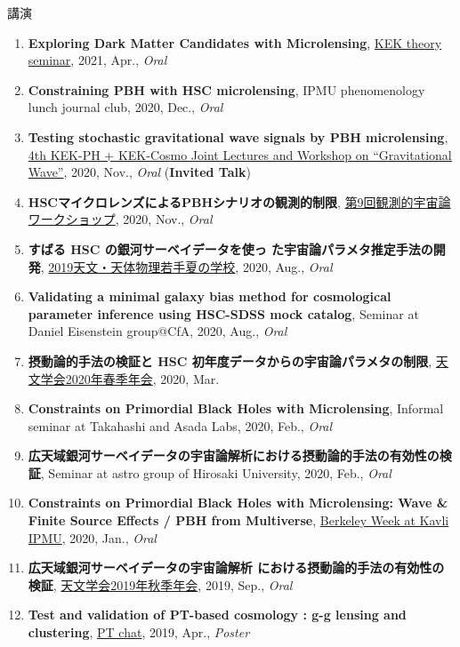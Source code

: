 \begin{rSection}{講演}
\begin{enumerate}[itemsep=0pt, parsep=0pt, topsep=0pt, partopsep=0pt]
\item \textbf{Exploring Dark Matter Candidates with Microlensing}, \href{https://www.kek.jp/ja/conference/20210407-3/}{KEK theory seminar}, 2021, Apr., \textit{Oral}
\item \textbf{Constraining PBH with HSC microlensing}, IPMU phenomenology lunch journal club, 2020, Dec., \textit{Oral}
\item \textbf{Testing stochastic gravitational wave signals by PBH microlensing}, \href{http://conference-indico.kek.jp/event/117/timetable/#day-2020-11-04}{4th KEK-PH + KEK-Cosmo Joint Lectures and Workshop on ``Gravitational Wave''}, 2020, Nov., \textit{Oral} (\textbf{Invited Talk})
\item \textbf{HSCマイクロレンズによるPBHシナリオの観測的制限}, \href{https://indico.ipmu.jp/event/382/timetable/#all}{第9回観測的宇宙論ワークショップ}, 2020, Nov., \textit{Oral}
\item \textbf{すばる HSC の銀河サーベイデータを使っ た宇宙論パラメタ推定手法の開発}, \href{http://www.astro-wakate.org/ss2019/web/}{2019天文・天体物理若手夏の学校}, 2020, Aug., \textit{Oral}
\item \textbf{Validating a minimal galaxy bias method for cosmological parameter inference using HSC-SDSS mock catalog}, Seminar at Daniel Eisenstein group@CfA, 2020, Aug., \textit{Oral}
\item \textbf{摂動論的手法の検証と HSC 初年度データからの宇宙論パラメタの制限}, \href{http://www.asj.or.jp/nenkai/archive/2020a/pdf/U03a.pdf}{天文学会2020年春季年会}, 2020, Mar.
\item \textbf{Constraints on Primordial Black Holes with Microlensing}, Informal seminar at Takahashi and Asada Labs, 2020, Feb., \textit{Oral}
\item \textbf{広天域銀河サーベイデータの宇宙論解析における摂動論的手法の有効性の検証}, Seminar at astro group of Hirosaki University, 2020, Feb., \textit{Oral}
\item \textbf{Constraints on Primordial Black Holes with Microlensing: Wave \& Finite Source Effects / PBH from Multiverse}, \href{http://indico.ipmu.jp/event/313/overview}{Berkeley Week at Kavli IPMU}, 2020, Jan., \textit{Oral}
\item \textbf{広天域銀河サーベイデータの宇宙論解析 における摂動論的手法の有効性の検証}, \href{https://www.asj.or.jp/nenkai/archive/2019b/pdf/U20a.pdf}{天文学会2019年秋季年会}, 2019, Sep., \textit{Oral}
\item \textbf{Test and validation of PT-based cosmology : g-g lensing and clustering}, \href{http://pt-chat-kyoto.sciencesconf.org/}{PT chat}, 2019, Apr., \textit{Poster}

\end{enumerate}
\end{rSection}
